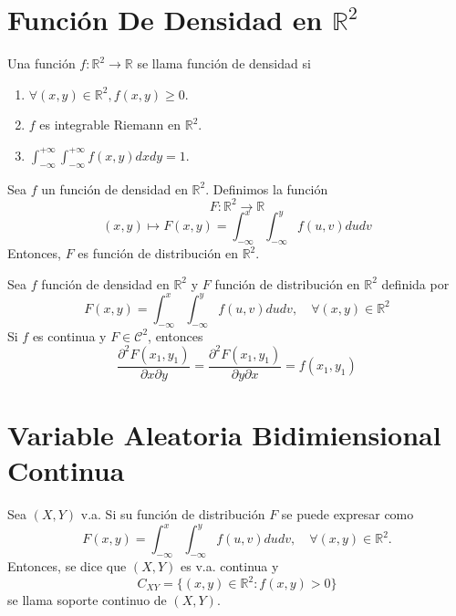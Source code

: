\section{Función De Densidad en $\mathbb{R}^{2}$}

\begin{defn}
  Una función $f : \mathbb{R}^{2} \to \mathbb{R}$ se llama función de densidad si 
  \begin{enumerate}[label=(\roman*)]
    \item $\forall (x,y) \in \mathbb{R}^{2}, f(x,y) \geq 0$.
    \item $f$ es integrable Riemann en $\mathbb{R}^{2}$.
    \item $\int_{- \infty}^{+ \infty} \int_{-\infty}^{+\infty} f(x,y) dx dy = 1$.
  \end{enumerate}
\end{defn}

\begin{theo}
  Sea $f$ un función de densidad en $\mathbb{R}^{2}$. Definimos la función
  \[ 
    F : \mathbb{R}^{2} \to \mathbb{R} 
  \] 
  \[ 
    (x,y) \mapsto F(x, y) = \int_{-\infty}^{x} \int_{-\infty}^{y} f(u,v) du dv
  \] 
  Entonces, $F$ es función de distribución en $\mathbb{R}^{2}$.
\end{theo}

\begin{theo}
  Sea $f$ función de densidad en $\mathbb{R}^{2}$ y $F$ función de distribución en $\mathbb{R}^{2}$ definida por
  \[ 
    F(x,y) = \int_{-\infty}^{x} \int_{-\infty}^{y} f(u,v) du dv, \quad \forall (x,y) \in \mathbb{R}^{2}
  \] 
  Si $f$ es continua y $F \in \mathcal{C}^{2}$, entonces
  \[ 
    \frac{\partial^2{F(x_{1},y_{1})}}{\partial{x} \partial{y}} = \frac{\partial^2{F(x_{1},y_{1})}}{\partial{y} \partial{x}} = f(x_{1}, y_{1})
  \] 
\end{theo}

\section{Variable Aleatoria Bidimiensional Continua}

\begin{defn}
  Sea $(X,Y)$ v.a. Si su función de distribución $F$ se puede expresar como
  \[ 
    F(x,y) = \int_{-\infty}^{x} \int_{-\infty}^{y} f(u,v) du dv, \quad \forall (x,y) \in \mathbb{R}^{2}.
  \] 
  Entonces, se dice que $(X,Y)$ es v.a. continua y
  \[ 
    C_{XY} = \{ (x,y) \in \mathbb{R}^{2} : f(x,y) > 0 \} 
  \] 
  se llama soporte continuo de $(X,Y)$.
\end{defn}

